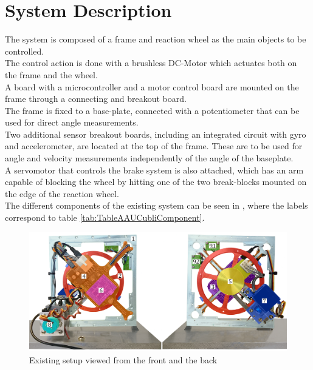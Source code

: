 \chapter{System Description}\label{systemDescription}
The system is composed of a frame and reaction wheel as the main objects to be controlled.\\
The control action is done with a brushless DC-Motor which actuates both on the frame and the wheel.\\ 
A board with a microcontroller and a motor control board are mounted on the frame through a connecting and breakout board.\\ 
The frame is fixed to a base-plate, connected with a potentiometer that can be used for direct angle measurements.\\ 
Two additional sensor breakout boards, including an integrated circuit with gyro and accelerometer, are located at the top of the frame. These are to be used for angle and velocity measurements independently of the angle of the baseplate.\\ 
A servomotor that controls the brake system is also attached, which has an arm capable of blocking the wheel by hitting one of the two break-blocks mounted on the edge of the reaction wheel.\\
The different components of the existing system can be seen in , where the labels correspond to table \ref{tab:TableAAUCubliComponent}.
\\
\begin{figure}[H]
	\centering
	\includegraphics[scale=0.27]{figures/Cubli12}
	\caption{Existing setup viewed from the front and the back}
	\label{CubliParts}
\end{figure}
%
